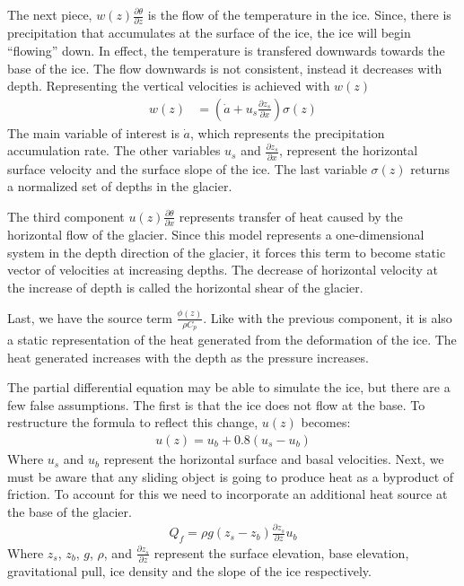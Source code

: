 \documentclass{article}%
\begin{document}
    The next piece, $w(z) \frac{\partial \theta}{\partial z}$ is the flow of the temperature in the ice. Since, there is precipitation that accumulates at the surface of the ice, the ice will begin ``flowing'' down. In effect, the temperature is transfered downwards towards the base of the ice. The flow downwards is not consistent, instead it decreases with depth. Representing the vertical velocities is achieved with $w(z)$
    \begin{align*}
        w(z) &= (\dot{a} + u_s \frac{\partial z_s}{\partial x}) \sigma(z)
    \end{align*}
    The main variable of interest is $\dot{a}$, which represents the precipitation accumulation rate. The other variables $u_s$ and $\frac{\partial z_s}{\partial x}$, represent the horizontal surface velocity and the surface slope of the ice. The last variable $\sigma(z)$ returns a normalized set of depths in the glacier. 

    The third component $u(z) \frac{\partial \theta}{\partial x}$ represents transfer of heat caused by the horizontal flow of the glacier. Since this model represents a one-dimensional system in the depth direction of the glacier, it forces this term to become static vector of velocities at increasing depths. The decrease of horizontal velocity at the increase of depth is called the horizontal shear of the glacier. 

    Last, we have the source term $\frac{\phi(z)}{\rho C_p}$. Like with the previous component, it is also a static representation of the heat generated from the deformation of the ice. The heat generated increases with the depth as the pressure increases. 

    The partial differential equation may be able to simulate the ice, but there are a few false assumptions. The first is that the ice does not flow at the base. To restructure the formula to reflect this change, $u(z)$ becomes:
    \begin{align*}
        u(z) = u_b + 0.8(u_s - u_b)
    \end{align*}
    Where $u_s$ and $u_b$ represent the horizontal surface and basal velocities. Next, we must be aware that any sliding object is going to produce heat as a byproduct of friction. To account for this we need to incorporate an additional heat source at the base of the glacier.  
    \begin{align*}
        Q_f = \rho g (z_s - z_b) \frac{\partial z_s}{\partial z} u_b
    \end{align*}  
    Where $z_s$, $z_b$, $g$, $\rho$, and $\frac{\partial z_s}{\partial z}$ represent the surface elevation, base elevation, gravitational pull, ice density and the slope of the ice respectively. 
\end{document}
